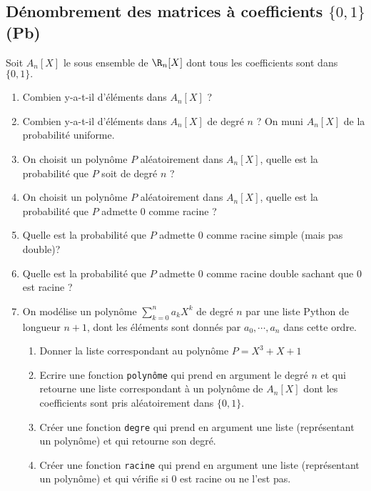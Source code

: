 \subsection{Dénombrement des matrices à coefficients $\{ 0,1\}$ (Pb)}
\begin{exercice}
Soit $A_n[X]$ le sous ensemble de $\R_n[X]$ dont tous les coefficients sont dans $\{0,1\}.$ 

\begin{enumerate}
\item Combien y-a-t-il d'éléments dans $A_n[X]$  ?
\item Combien y-a-t-il d'éléments dans $A_n[X]$ de degré $n$ ? 
On muni $A_n[X]$ de la probabilité uniforme. 
\item On choisit un polynôme $P$ aléatoirement dans $A_n[X]$, quelle est la probabilité que $P$ soit de degré $n$ ? 
\item On choisit un polynôme $P$ aléatoirement dans $A_n[X]$, quelle est la probabilité que $P$ admette 0 comme racine ? 
\item Quelle est la probabilité que $P$ admette $0$ comme racine simple (mais pas double)? 
\item Quelle est la probabilité que $P$ admette $0$ comme racine double sachant que $0$ est racine  ? 
\item On modélise un polynôme  $\sum_{k=0}^na_k X^k$ de degré $n$ par une liste Python de longueur $n+1$, dont les éléments sont donnés par $a_0,\cdots, a_n$ dans cette ordre. 
\begin{enumerate}
\item Donner la liste correspondant au polynôme  $P = X^3+X+1$
\item Ecrire une fonction \texttt{polynôme} qui prend en argument le degré $n$ et qui retourne une liste correspondant à un polynôme de $A_n[X]$ dont les coefficients sont pris aléatoirement dans $\{0,1\}$. 
\item Créer une fonction \texttt{degre} qui prend en argument une liste (représentant un polynôme) et qui retourne son degré. 
\item Créer une fonction \texttt{racine} qui prend en argument une liste (représentant un polynôme) et qui vérifie si $0$ est racine ou ne l'est pas. 
\end{enumerate}
\end{enumerate} 
\end{exercice}


